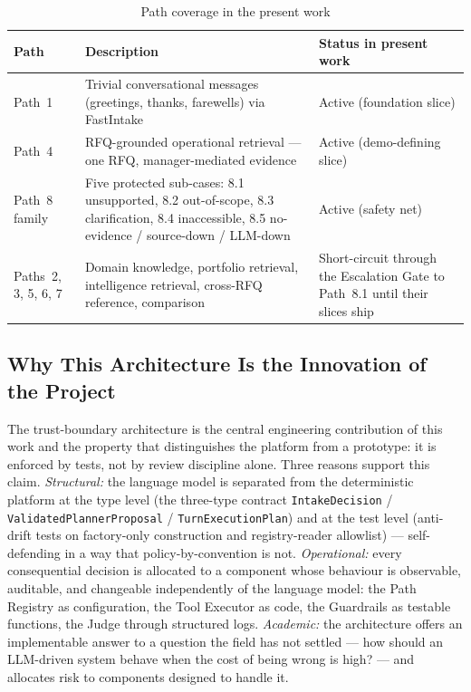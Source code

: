 \begin{table}[H]
\centering
\renewcommand{\arraystretch}{1.3}
\scriptsize
\begin{tabularx}{\textwidth}{|p{2.4cm}|>{\RaggedRight\arraybackslash}X|p{3.5cm}|}
\hline
\rowcolor{lightgray}
\textbf{Path} & \textbf{Description} & \textbf{Status in present work} \\ \hline
Path~1 & Trivial conversational messages (greetings, thanks, farewells) via FastIntake & Active (foundation slice) \\ \hline
Path~4 & RFQ-grounded operational retrieval --- one RFQ, manager-mediated evidence & Active (demo-defining slice) \\ \hline
Path~8 family & Five protected sub-cases: 8.1 unsupported, 8.2 out-of-scope, 8.3 clarification, 8.4 inaccessible, 8.5 no-evidence / source-down / LLM-down & Active (safety net) \\ \hline
Paths~2, 3, 5, 6, 7 & Domain knowledge, portfolio retrieval, intelligence retrieval, cross-RFQ reference, comparison & Short-circuit through the Escalation Gate to Path~8.1 until their slices ship \\ \hline
\end{tabularx}
\caption{Path coverage in the present work}
\label{tab:path_coverage}
\end{table}

\subsection{Why This Architecture Is the Innovation of the Project}
The trust-boundary architecture is the central engineering contribution of this work and the property that distinguishes the platform from a prototype: it is enforced by tests, not by review discipline alone. Three reasons support this claim. \textit{Structural:} the language model is separated from the deterministic platform at the type level (the three-type contract \texttt{IntakeDecision} / \texttt{ValidatedPlannerProposal} / \texttt{TurnExecutionPlan}) and at the test level (anti-drift tests on factory-only construction and registry-reader allowlist) --- self-defending in a way that policy-by-convention is not. \textit{Operational:} every consequential decision is allocated to a component whose behaviour is observable, auditable, and changeable independently of the language model: the Path Registry as configuration, the Tool Executor as code, the Guardrails as testable functions, the Judge through structured logs. \textit{Academic:} the architecture offers an implementable answer to a question the field has not settled --- how should an LLM-driven system behave when the cost of being wrong is high? --- and allocates risk to components designed to handle it.

